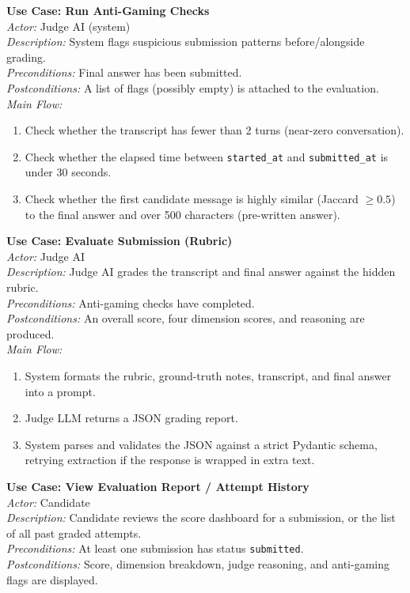\documentclass[12pt,a4paper]{report}
\begin{document}
\vspace{0.3cm}
\textbf{Use Case: Run Anti-Gaming Checks}\\
\emph{Actor:} Judge AI (system)\\
\emph{Description:} System flags suspicious submission patterns before/alongside grading.\\
\emph{Preconditions:} Final answer has been submitted.\\
\emph{Postconditions:} A list of flags (possibly empty) is attached to the evaluation.\\
\emph{Main Flow:}
\begin{enumerate}[nosep]
    \item Check whether the transcript has fewer than 2 turns (near-zero conversation).
    \item Check whether the elapsed time between \texttt{started\_at} and \texttt{submitted\_at} is under 30 seconds.
    \item Check whether the first candidate message is highly similar (Jaccard $\geq 0.5$) to the final answer and over 500 characters (pre-written answer).
\end{enumerate}

\vspace{0.3cm}
\textbf{Use Case: Evaluate Submission (Rubric)}\\
\emph{Actor:} Judge AI\\
\emph{Description:} Judge AI grades the transcript and final answer against the hidden rubric.\\
\emph{Preconditions:} Anti-gaming checks have completed.\\
\emph{Postconditions:} An overall score, four dimension scores, and reasoning are produced.\\
\emph{Main Flow:}
\begin{enumerate}[nosep]
    \item System formats the rubric, ground-truth notes, transcript, and final answer into a prompt.
    \item Judge LLM returns a JSON grading report.
    \item System parses and validates the JSON against a strict Pydantic schema, retrying extraction if the response is wrapped in extra text.
\end{enumerate}

\vspace{0.3cm}
\textbf{Use Case: View Evaluation Report / Attempt History}\\
\emph{Actor:} Candidate\\
\emph{Description:} Candidate reviews the score dashboard for a submission, or the list of all past graded attempts.\\
\emph{Preconditions:} At least one submission has status \texttt{submitted}.\\
\emph{Postconditions:} Score, dimension breakdown, judge reasoning, and anti-gaming flags are displayed.
\end{document}
